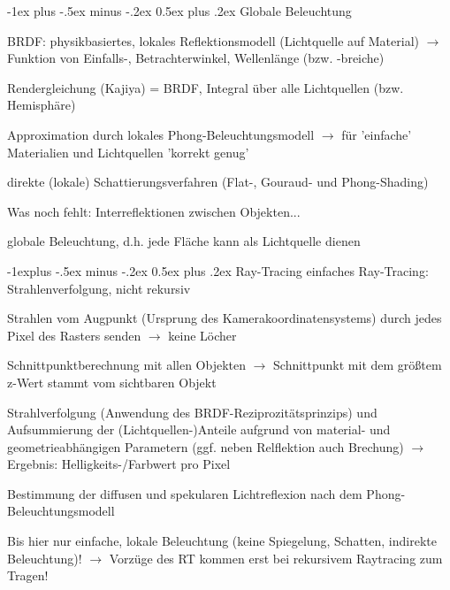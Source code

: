 \documentclass[landscape]{article}
\makeatletter
\renewcommand{\section}{\@startsection{section}{1}{0mm}%
                                {-1ex plus -.5ex minus -.2ex}%
                                {0.5ex plus .2ex}%
                                {\normalfont\large\bfseries}}
\renewcommand{\subsection}{\@startsection{subsection}{2}{0mm}%
                                {-1explus -.5ex minus -.2ex}%
                                {0.5ex plus .2ex}%
                                {\normalfont\normalsize\bfseries}}
\makeatother
\begin{document}
\begin{multicols}{3}
  \section{Globale Beleuchtung}
  \begin{itemize*}
    \item BRDF: physikbasiertes, lokales Reflektionsmodell (Lichtquelle auf Material) $\rightarrow$ Funktion von Einfalls-, Betrachterwinkel, Wellenlänge (bzw. -breiche)
    \item Rendergleichung (Kajiya) = BRDF, Integral über alle Lichtquellen (bzw. Hemisphäre)
    \item Approximation durch lokales Phong-Beleuchtungsmodell $\rightarrow$ für 'einfache' Materialien und Lichtquellen 'korrekt genug'
    \item direkte (lokale) Schattierungsverfahren (Flat-, Gouraud- und Phong-Shading)
    \item Was noch fehlt: Interreflektionen zwischen Objekten...
    \item globale Beleuchtung, d.h. jede Fläche kann als Lichtquelle dienen
  \end{itemize*}
  
  \subsection{ Ray-Tracing}
  einfaches Ray-Tracing: Strahlenverfolgung, nicht rekursiv
  \begin{itemize*}
    \item Strahlen vom Augpunkt (Ursprung des Kamerakoordinatensystems) durch jedes Pixel des Rasters senden $\rightarrow$ keine Löcher
    \item Schnittpunktberechnung mit allen Objekten $\rightarrow$ Schnittpunkt mit dem größtem z-Wert stammt vom sichtbaren Objekt
    \item Strahlverfolgung (Anwendung des BRDF-Reziprozitätsprinzips) und Aufsummierung der (Lichtquellen-)Anteile aufgrund von material- und geometrieabhängigen Parametern (ggf. neben Relflektion auch Brechung) $\rightarrow$ Ergebnis: Helligkeits-/Farbwert pro Pixel
    \item Bestimmung der diffusen und spekularen Lichtreflexion nach dem Phong-Beleuchtungsmodell
    \item Bis hier nur einfache, lokale Beleuchtung (keine Spiegelung, Schatten, indirekte Beleuchtung)! $\rightarrow$ Vorzüge des RT kommen erst bei rekursivem Raytracing zum Tragen!
  \end{itemize*}
  

\end{multicols}
\end{document}
